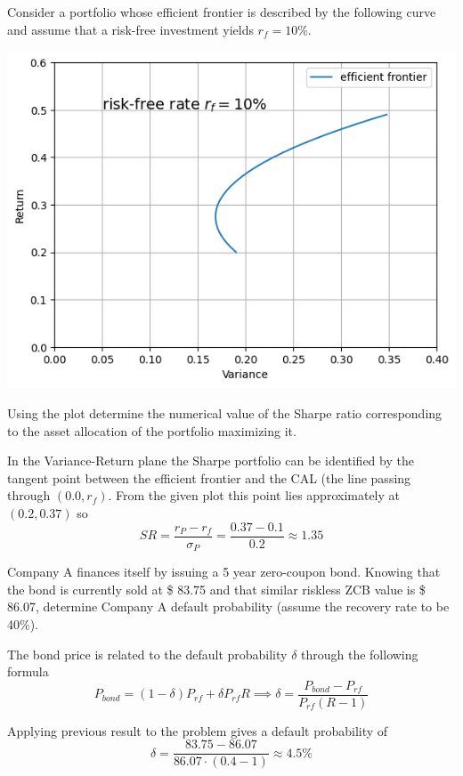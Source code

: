 \documentclass[12pt,a4paper]{exam}
\begin{document}
\begin{questions}
\question
Consider a portfolio whose efficient frontier is described by the following curve and assume that a risk-free investment yields $r_f = 10\%$.
\begin{center}
  \includegraphics[width=0.7\linewidth]{efficient_frontier}
\end{center}
Using the plot determine the numerical value of the Sharpe ratio corresponding to the asset allocation of the portfolio maximizing it.
\fillwithlines{3cm}
\begin{solution}
In the Variance-Return plane the Sharpe portfolio can be identified by the tangent point between the efficient frontier and the CAL (the line passing through $(0.0, r_f)$. From the given plot this point lies approximately at $(0.2, 0.37)$ so
\begin{equation*}
  SR = \frac{r_P - r_f}{\sigma_P} = \frac{0.37-0.1}{0.2} \approx 1.35
\end{equation*}
\end{solution}

\question
Company A finances itself by issuing a 5 year zero-coupon bond. Knowing that the bond is currently sold at \$ 83.75 and that similar riskless ZCB value is \$ 86.07, determine Company A default probability (assume the recovery rate to be 40\%).
\fillwithlines{3cm}
\begin{solution}
The bond price is related to the default probability $\delta$ through the following formula
\begin{equation*}
  P_{bond} = (1-\delta)P_{rf} + \delta P_{rf} R \implies \delta = \frac{P_{bond}-P_{rf}}{P_{rf}(R-1)}
\end{equation*}

Applying previous result to the problem gives a default probability of
\begin{equation*}
  \delta = \frac{83.75-86.07}{86.07\cdot(0.4-1)} \approx 4.5\% 
\end{equation*}
\end{solution}


\end{questions}
\end{document}
